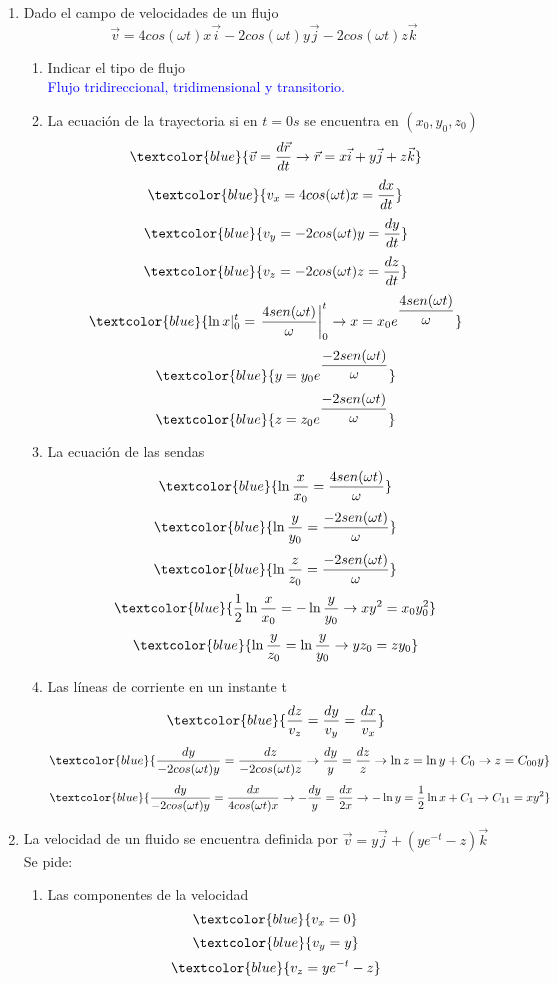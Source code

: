 \begin{enumerate}
	\item Dado el campo de velocidades de un flujo
	\[\vec{v}=4cos(\omega t)x\vec{i}-2cos(\omega t)y\vec{j}-2cos(\omega t)z\vec{k}\]
	\begin{enumerate}
		\item Indicar el tipo de flujo\\
		\textcolor{blue}{Flujo tridireccional, tridimensional y transitorio.}
		\item La ecuación de la trayectoria si en $t=0s$ se encuentra en $(x_0,y_0,z_0)$
		\[\textcolor{blue}{\vec{v}=\dfrac{d\vec{r}}{dt} \rightarrow \vec{r}=x\vec{i}+y\vec{j}+z\vec{k}}\]
		\[\textcolor{blue}{v_x=4cos(\omega t)x=\dfrac{dx}{dt}}\]
		\[\textcolor{blue}{v_y= -2cos(\omega t)y = \dfrac{dy}{dt}}\]
		\[\textcolor{blue}{v_z= -2cos(\omega t)z = \dfrac{dz}{dt}} \]
		\[\textcolor{blue}{\ln x|_0^t=\left.{\dfrac{4sen(\omega t)}{\omega}}\right |_0^t \rightarrow x=x_0 e^{\dfrac{4sen(\omega t)}{\omega}}}\]
		\[\textcolor{blue}{y=y_0 e^{\dfrac{-2sen(\omega t)}{\omega}}}\]
		\[\textcolor{blue}{z=z_0 e^{\dfrac{-2sen(\omega t)}{\omega}}}\]
		\item La ecuación de las sendas
		\[\textcolor{blue}{\ln \dfrac{x}{x_0}=\dfrac{4sen(\omega t)}{\omega}}\]
		\[\textcolor{blue}{\ln \dfrac{y}{y_0}=\dfrac{-2sen(\omega t)}{\omega}}\]
		\[\textcolor{blue}{\ln \dfrac{z}{z_0}=\dfrac{-2sen(\omega t)}{\omega}}\]
		\[\textcolor{blue}{\dfrac{1}{2}\ln \dfrac{x}{x_0}=-\ln \dfrac{y}{y_0} \rightarrow xy^2=x_0y_0^2}\]
		\[\textcolor{blue}{\ln \dfrac{y}{z_0}=\ln \dfrac{y}{y_0} \rightarrow yz_0=zy_0}\]
		\item Las líneas de corriente en un instante t
		\[\textcolor{blue}{\dfrac{dz}{v_z}=\dfrac{dy}{v_y}=\dfrac{dx}{v_x}}\]
		\[\textcolor{blue}{\dfrac{dy}{-2cos(\omega t)y}=\dfrac{dz}{-2cos(\omega t)z}\rightarrow \dfrac{dy}{y}=\dfrac{dz}{z}\rightarrow \ln z = \ln y + C_0 \rightarrow z=C_{00}y}\]
		\[\textcolor{blue}{\dfrac{dy}{-2cos(\omega t)y}=\dfrac{dx}{4cos(\omega t)x}\rightarrow -\dfrac{dy}{y}=\dfrac{dx}{2x}\rightarrow -\ln y = \dfrac{1}{2}\ln x + C_1 \rightarrow C_{11}=xy^2 }\]
	\end{enumerate}
	\newpage
	\item La velocidad de un fluido se encuentra definida por $\vec{v}=y\vec{j}+\left(ye^{-t}-z\right)\vec{k}$ Se pide:
	\begin{enumerate}
		\item Las componentes de la velocidad 
		\[\textcolor{blue}{v_x=0} \]
		\[	\textcolor{blue}{ v_y=y}\] 
			\[\textcolor{blue}{ v_z=ye^{-t} -z}\]

\end{enumerate}
\end{enumerate}
